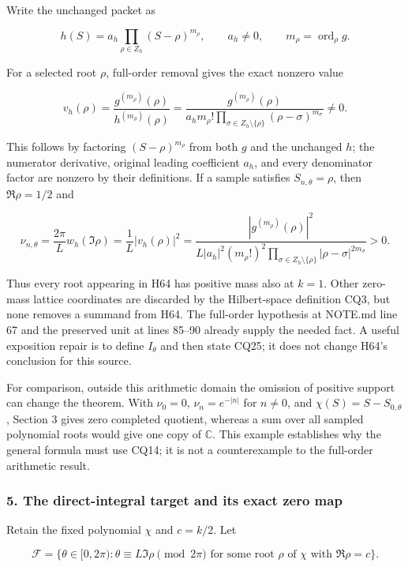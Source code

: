 Write the unchanged packet as

\[
h(S)=a_h\prod_{\rho\in Z_h}(S-\rho)^{m_\rho},
\qquad a_h\ne0,\qquad m_\rho=\operatorname{ord}_\rho g.
\tag{CQ23}
\]

For a selected root \(\rho\), full-order removal gives the exact nonzero value

\[
v_h(\rho)=
\frac{g^{(m_\rho)}(\rho)}{h^{(m_\rho)}(\rho)}=
\frac{g^{(m_\rho)}(\rho)}
{a_hm_\rho!\prod_{\sigma\in Z_h\setminus\{\rho\}}
(\rho-\sigma)^{m_\sigma}}\ne0.
\tag{CQ24}
\]

This follows by factoring \((S-\rho)^{m_\rho}\) from both \(g\) and the unchanged \(h\); the numerator derivative, original leading coefficient \(a_h\), and every denominator factor are nonzero by their definitions. If a sample satisfies \(S_{n,\theta}=\rho\), then \(\Re \rho=1/2\) and

\[
\nu_{n,\theta}
=\frac{2\pi}L w_h(\Im\rho)
=\frac1L|v_h(\rho)|^2
=\frac{|g^{(m_\rho)}(\rho)|^2}
{L|a_h|^2(m_\rho!)^2\prod_{\sigma\in Z_h\setminus\{\rho\}}|\rho-\sigma|^{2m_\sigma}}>0.
\tag{CQ25}
\]

Thus every root appearing in H64 has positive mass also at \(k=1\). Other zero-mass lattice coordinates are discarded by the Hilbert-space definition CQ3, but none removes a summand from H64. The full-order hypothesis at NOTE.md line 67 and the preserved unit at lines 85--90 already supply the needed fact. A useful exposition repair is to define \(I_\theta\) and then state CQ25; it does not change H64's conclusion for this source.

For comparison, outside this arithmetic domain the omission of positive support can change the theorem. With \(\nu_0=0\), \(\nu_n=e^{-|n|}\) for \(n \ne 0\), and \(\chi(S)=S-S_{0,\theta}\), Section 3 gives zero completed quotient, whereas a sum over all sampled polynomial roots would give one copy of \(\mathbb C\). This example establishes why the general formula must use CQ14; it is not a counterexample to the full-order arithmetic result.

\subsubsection{5. The direct-integral target and its exact zero map}\label{the-direct-integral-target-and-its-exact-zero-map}

Retain the fixed polynomial \(\chi\) and \(c=k/2\). Let

\[
\mathcal F=
\{\theta\in[0,2\pi):
\theta\equiv L\Im\rho\pmod{2\pi}
\text{ for some root }\rho\text{ of }\chi
\text{ with }\Re\rho=c\}.
\tag{CQ26}
\]

